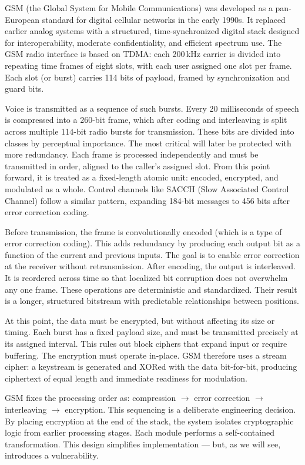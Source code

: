 GSM (the Global System for Mobile Communications) was developed as a pan-European standard for digital cellular networks in the early 1990s. It replaced earlier analog systems with a structured, time-synchronized digital stack designed for interoperability, moderate confidentiality, and efficient spectrum use. The GSM radio interface is based on TDMA: each 200 kHz carrier is divided into repeating time frames of eight slots, with each user assigned one slot per frame. Each slot (or burst) carries 114 bits of payload, framed by synchronization and guard bits.

Voice is transmitted as a sequence of such bursts. Every 20 milliseconds of speech is compressed into a 260-bit frame, which after coding and interleaving is split across multiple 114-bit radio bursts for transmission. These bits are divided into classes by perceptual importance. The most critical will later be protected with more redundancy. Each frame is processed independently and must be transmitted in order, aligned to the caller’s assigned slot. From this point forward, it is treated as a fixed-length atomic unit: encoded, encrypted, and modulated as a whole. Control channels like SACCH (Slow Associated Control Channel) follow a similar pattern, expanding 184-bit messages to 456 bits after error correction coding.

Before transmission, the frame is convolutionally encoded (which is a type of error correction coding). This adds redundancy by producing each output bit as a function of the current and previous inputs. The goal is to enable error correction at the receiver without retransmission. After encoding, the output is interleaved. It is reordered across time so that localized bit corruption does not overwhelm any one frame. These operations are deterministic and standardized. Their result is a longer, structured bitstream with predictable relationships between positions.

At this point, the data must be encrypted, but without affecting its size or timing. Each burst has a fixed payload size, and must be transmitted precisely at its assigned interval. This rules out block ciphers that expand input or require buffering. The encryption must operate in-place. GSM therefore uses a stream cipher: a keystream is generated and XORed with the data bit-for-bit, producing ciphertext of equal length and immediate readiness for modulation.

GSM fixes the processing order as: compression $\rightarrow$ error correction $\rightarrow$ interleaving $\rightarrow$ encryption. This sequencing is a deliberate engineering decision. By placing encryption at the end of the stack, the system isolates cryptographic logic from earlier processing stages. Each module performs a self-contained transformation. This design simplifies implementation — but, as we will see, introduces a vulnerability.

